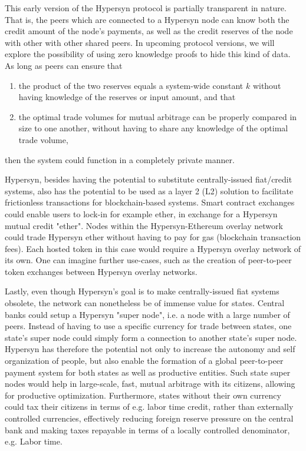 \documentclass{article}
\begin{document}
This early version of the Hypersyn protocol is partially transparent in nature. That is, the peers which are connected to a Hypersyn node can know both the credit amount of the node's payments, as well as the credit reserves of the node with other with other shared peers. In upcoming protocol versions, we will explore the possibility of using zero knowledge proofs to hide this kind of data. As long as peers can ensure that 
\begin{enumerate}
    \item the product of the two reserves equals a system-wide constant $k$ without having knowledge of the reserves or input amount, and that
    \item the optimal trade volumes for mutual arbitrage can be properly compared in size to one another, without having to share any knowledge of the optimal trade volume,
\end{enumerate}
then the system could function in a completely private manner. 

Hypersyn, besides having the potential to substitute centrally-issued fiat/credit systems, also has the potential to be used as a layer 2 (L2) solution to facilitate frictionless transactions for blockchain-based systems. Smart contract exchanges could enable users to lock-in for example ether, in exchange for a Hypersyn mutual credit "ether". Nodes within the Hypersyn-Ethereum overlay network could trade Hypersyn ether without having to pay for gas (blockchain transaction fees). Each hosted token in this case would require a Hypersyn overlay network of its own. One can imagine further use-cases, such as the creation of peer-to-peer token exchanges between Hypersyn overlay networks.

Lastly, even though Hypersyn's goal is to make centrally-issued fiat systems obsolete, the network can nonetheless be of immense value for states. Central banks could setup a Hypersyn "super node", i.e. a node with a large number of peers. Instead of having to use a specific currency for trade between states, one state's super node could simply form a connection to another state's super node. Hypersyn has therefore the potential not only to increase the autonomy and self organization of people, but also enable the formation of a global peer-to-peer payment system for both states as well as productive entities. Such state super nodes would help in large-scale, fast, mutual arbitrage with its citizens, allowing for productive optimization. Furthermore, states without their own currency could tax their citizens in terms of e.g. labor time credit, rather than externally controlled currencies, effectively reducing foreign reserve pressure on the central bank and making taxes repayable in terms of a locally controlled denominator, e.g. Labor time.
\end{document}
